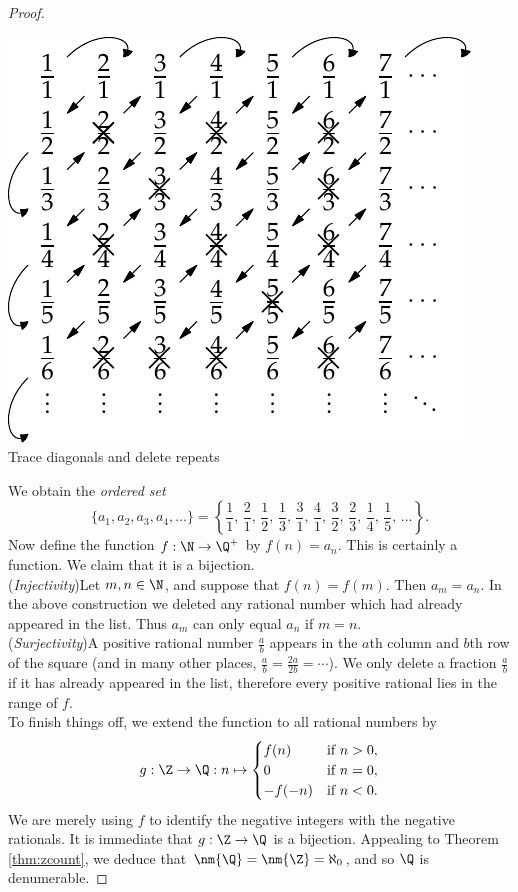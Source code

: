 \begin{proof}
\begin{center}
\begin{minipage}{0.38\textwidth}
\includegraphics[width=\textwidth]{cardinality-02-qcount}\\
Trace diagonals and delete repeats
\end{minipage}
\end{center}
We obtain the \emph{ordered set}
\[\{a_1,a_2,a_3,a_4,\ldots\}=\left\{{\frac 11,\,\frac 21,\,\frac 12,\,\frac 13,\,\frac 31,\,\frac 41,\,\frac 32,\,\frac 23,\,\frac 14,\,\frac 15,\,\ldots}\right\}.\]
Now define the function $f:\N\to\Q^+$ by $f(n)=a_n$. This is certainly a function. We claim that it is a bijection.\\[-5pt]

\noindent(\emph{Injectivity})\quad Let $m,n\in\N$, and suppose that $f(n)=f(m)$. Then $a_m=a_n$. In the above construction we deleted any rational number which had already appeared in the list. Thus $a_m$ can only equal $a_n$ if $m=n$.\\[-5pt]

\noindent(\emph{Surjectivity})\quad A positive rational number $\frac ab$ appears in the $a$th column and $b$th row of the square (and in many other places, $\frac ab=\frac{2a}{2b}=\cdots$). We only delete a fraction $\frac ab$ if it has already appeared in the list, therefore every positive rational lies in the range of $f$.\\[-5pt]

\noindent To finish things off, we extend the function to all rational numbers by
\[g:\Z\to\Q:n\mapsto\begin{cases}
f(n)&\text{if }n>0,\\
0&\text{if }n=0,\\
-f(-n)&\text{if }n<0.
\end{cases}\]
We are merely using $f$ to identify the negative integers with the negative rationals. It is immediate that $g:\Z\to\Q$ is a bijection. Appealing to Theorem \ref{thm:zcount}, we deduce that $\nm{\Q}=\nm{\Z}=\aleph_0$, and so $\Q$ is denumerable.
\end{proof}


